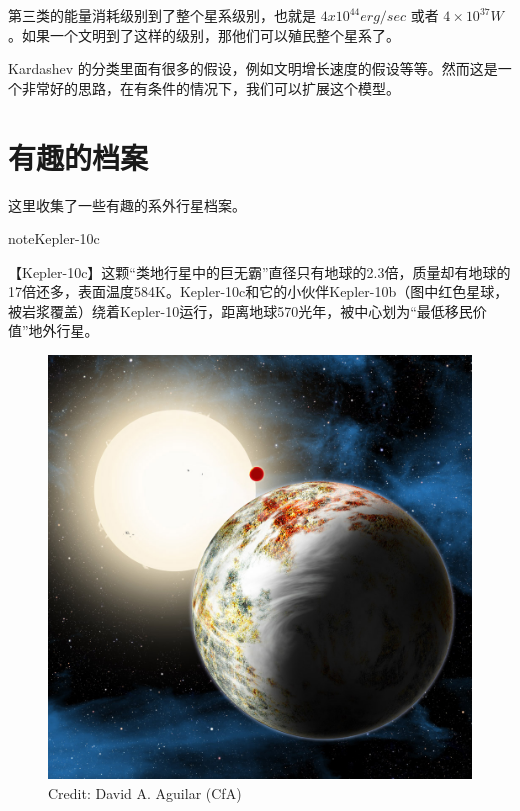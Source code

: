 \documentclass[letterpaper,10pt,english]{sphinxmanual}
\begin{document}
第三类的能量消耗级别到了整个星系级别，也就是 \(4 x 10^{44} erg/sec\) 或者 \(4×10^{37} W\) 。如果一个文明到了这样的级别，那他们可以殖民整个星系了。

Kardashev 的分类里面有很多的假设，例如文明增长速度的假设等等。然而这是一个非常好的思路，在有条件的情况下，我们可以扩展这个模型。


\section{有趣的档案}
\label{exoint::doc}\label{exoint:id1}
这里收集了一些有趣的系外行星档案。

\begin{notice}{note}{Kepler-10c}

【Kepler-10c】这颗“类地行星中的巨无霸”直径只有地球的2.3倍，质量却有地球的17倍还多，表面温度584K。Kepler-10c和它的小伙伴Kepler-10b（图中红色星球，被岩浆覆盖）绕着Kepler-10运行，距离地球570光年，被中心划为“最低移民价值”地外行星。
\begin{figure}[htbp]
\centering
\capstart

\includegraphics{kepler-10c.jpg}
\caption{Credit: David A. Aguilar (CfA)}\end{figure}
\end{notice}
\end{document}
